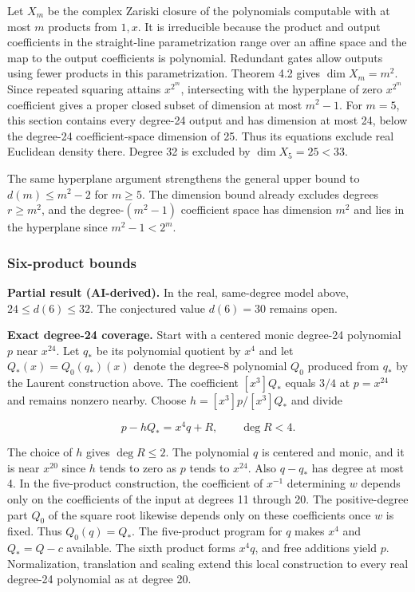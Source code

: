 \documentclass[11pt,a4paper]{article}
\begin{document}
Let \(X_m\) be the complex Zariski closure of the polynomials computable
with at most \(m\) products from \(1,x\). It is irreducible because the
product and output coefficients in the straight-line parametrization
range over an affine space and the map to the output coefficients is
polynomial. Redundant gates allow outputs using fewer products in this
parametrization. Theorem 4.2 gives \(\dim X_m=m^2\). Since repeated
squaring attains \(x^{2^m}\), intersecting with the hyperplane of zero
\(x^{2^m}\) coefficient gives a proper closed subset of dimension at
most \(m^2-1\). For \(m=5\), this section contains every degree-24
output and has dimension at most 24, below the degree-24
coefficient-space dimension of 25. Thus its equations exclude real
Euclidean density there. Degree 32 is excluded by \(\dim X_5=25<33\).

The same hyperplane argument strengthens the general upper bound to
\(d(m)\le m^2-2\) for \(m\ge 5\). The dimension bound already excludes
degrees \(r\ge m^2\), and the degree-\((m^2-1)\) coefficient space has
dimension \(m^2\) and lies in the hyperplane since \(m^2-1<2^m\).

\subsubsection{Six-product bounds}\label{six-product-bounds}

\textbf{Partial result (AI-derived).} In the real, same-degree model
above, \(24\le d(6)\le 32\). The conjectured value \(d(6)=30\) remains
open.

\textbf{Exact degree-24 coverage.} Start with a centered monic degree-24
polynomial \(p\) near \(x^{24}\). Let \(q_*\) be its polynomial quotient
by \(x^4\) and let \(Q_*(x)=Q_0(q_*)(x)\) denote the degree-8 polynomial
\(Q_0\) produced from \(q_*\) by the Laurent construction above. The
coefficient \([x^3]Q_*\) equals \(3/4\) at \(p=x^{24}\) and remains
nonzero nearby. Choose \(h=[x^3]p/[x^3]Q_*\) and divide

\[p-hQ_*=x^4q+R,\qquad \deg R<4.\]

The choice of \(h\) gives \(\deg R\le2\). The polynomial \(q\) is
centered and monic, and it is near \(x^{20}\) since \(h\) tends to zero
as \(p\) tends to \(x^{24}\). Also \(q-q_*\) has degree at most 4. In
the five-product construction, the coefficient of \(x^{-1}\) determining
\(w\) depends only on the coefficients of the input at degrees 11
through 20. The positive-degree part \(Q_0\) of the square root likewise
depends only on these coefficients once \(w\) is fixed. Thus
\(Q_0(q)=Q_*\). The five-product program for \(q\) makes \(x^4\) and
\(Q_*=Q-c\) available. The sixth product forms \(x^4q\), and free
additions yield \(p\). Normalization, translation and scaling extend
this local construction to every real degree-24 polynomial as at degree
20.
\end{document}

